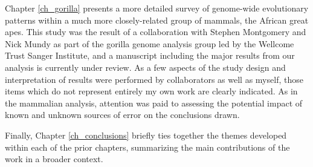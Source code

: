 Chapter \ref{ch_gorilla} presents a more detailed survey of
genome-wide evolutionary patterns within a much more closely-related
group of mammals, the African great apes. This study was the result of
a collaboration with Stephen Montgomery and Nick Mundy as part of the
gorilla genome analysis group led by the Wellcome Trust Sanger
Institute, and a manuscript including the major results from our
analysis is currently under review. As a few aspects of the study
design and interpretation of results were performed by collaborators
as well as myself, those items which do not represent entirely my own
work are clearly indicated. As in the mammalian analysis, attention
was paid to assessing the potential impact of known and unknown
sources of error on the conclusions drawn.

Finally, Chapter \ref{ch_conclusions} briefly ties together the themes
developed within each of the prior chapters, summarizing the main
contributions of the work in a broader context.
